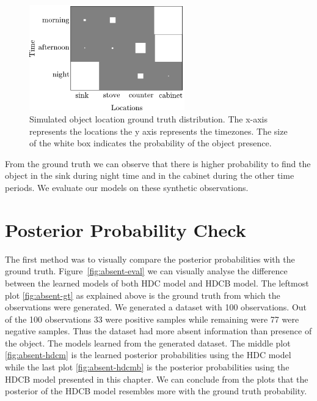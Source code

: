 \begin{figure}[htp]
\centering
\includegraphics[width=0.6\textwidth]{images/absent_groundtruth.png}
\caption[Simulated object location ground truth distribution]{Simulated object location ground truth distribution.
The x-axis represents the locations the y axis represents the timezones. The size of the white box indicates the probability of the object presence.}
\label{absent-gt}
\end{figure}

From the ground truth we can observe that there is higher probability to find the object in the sink during night time and in the cabinet during the other time periods. We evaluate our models on these synthetic observations. 

\section{Posterior Probability Check}
The first method was to visually compare the posterior probabilities with the ground truth.  Figure~\ref{fig:absent-eval} we can visually analyse the difference between the learned models of both HDC model and HDCB model. The leftmost plot \ref{fig:absent-gt} as explained above is the ground truth from which the observations were generated. We generated a dataset with 100 observations. Out of the 100 observations 33 were positive samples while remaining were 77 were negative samples. Thus the dataset had more absent information than presence of the object. The models learned from the generated dataset. The middle plot \ref{fig:absent-hdcm} is the learned posterior probabilities using the HDC model while the last plot \ref{fig:absent-hdcmb} is the posterior probabilities using the HDCB model presented in this chapter. We can conclude from the plots that the posterior of the HDCB model resembles more with the ground truth probability. 

